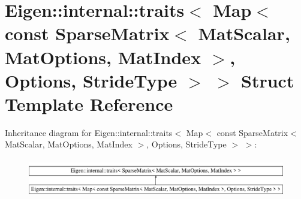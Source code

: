\hypertarget{struct_eigen_1_1internal_1_1traits_3_01_map_3_01const_01_sparse_matrix_3_01_mat_scalar_00_01_matec7066c11e5361dce6e4102c84e4bcd2}{}\section{Eigen\+::internal\+::traits$<$ Map$<$ const Sparse\+Matrix$<$ Mat\+Scalar, Mat\+Options, Mat\+Index $>$, Options, Stride\+Type $>$ $>$ Struct Template Reference}
\label{struct_eigen_1_1internal_1_1traits_3_01_map_3_01const_01_sparse_matrix_3_01_mat_scalar_00_01_matec7066c11e5361dce6e4102c84e4bcd2}
Inheritance diagram for Eigen\+::internal\+::traits$<$ Map$<$ const Sparse\+Matrix$<$ Mat\+Scalar, Mat\+Options, Mat\+Index $>$, Options, Stride\+Type $>$ $>$\+:\begin{figure}[H]
\begin{center}
\leavevmode
\includegraphics[height=1.715161cm]{struct_eigen_1_1internal_1_1traits_3_01_map_3_01const_01_sparse_matrix_3_01_mat_scalar_00_01_matec7066c11e5361dce6e4102c84e4bcd2}
\end{center}
\end{figure}
